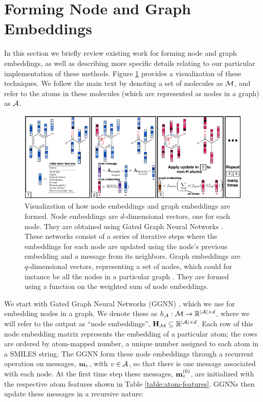 \section{Forming Node and Graph Embeddings}

In this section we briefly review existing work for forming node and graph embeddings, as well as describing more specific details relating to our particular implementation of these methods. Figure \ref{fig:graph_nn} provides a visualization of these techniques. 
We follow the main text by denoting a set of molecules as ${\mathcal{M}}$, and refer to the atoms in these molecules (which are represented as nodes in a graph) as ${\mathcal{A}}$.


\begin{figure}
\centering
\includegraphics[width=\textwidth]{imgs/graph_nn}
\caption{
Visualization of how node embeddings and graph embeddings are formed. 
Node embeddings are $d$-dimensional vectors, one for each node. 
They are obtained using Gated Graph Neural Networks \citep{li2016gated}.
These networks consist of a series of iterative steps where the embeddings for each node are updated using the node's previous embedding and a message from its neighbors.
 Graph embeddings are $q$-dimensional vectors, representing a set of nodes, which could for instance be all the nodes in a particular graph \citep{li2018learning}.
  They are formed using a function on the weighted sum of node embeddings.
}
\label{fig:graph_nn}
\end{figure}


 We start with Gated Graph Neural Networks (GGNN) \citep{li2016gated, gilmer2017neural}, which we use for embedding nodes in a graph.
 We denote these as $h_{{\mathcal{A}}}: {\mathcal{M}} \to \mathbb{R}^{|{\mathcal{A}}|\times d}$, where we will refer to the output as ``node embeddings'', ${\mathbf{H}}_{{\mathcal{M}}} \subseteq \mathbb{R}^{|{\mathcal{A}}|\times d}$. 
Each row of this node embedding matrix represents the embedding of a particular atom; the rows are ordered by atom-mapped number, a unique number assigned to each atom in a SMILES string.
The GGNN form these node embeddings through a recurrent operation on messages, ${\mathbf{m}}_v$, with $v \in {\mathcal{A}}$, so that there is one message associated with each node.
At the first time step these messages, ${\mathbf{m}}_v^{(0)}$, are initialized with the respective atom features shown in Table \ref{table:atom-features}. GGNNs then update these messages in a recursive nature:

